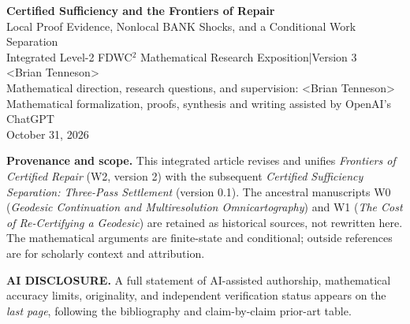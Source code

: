 \documentclass[11pt,letterpaper]{article}
\theoremstyle{definition}
\theoremstyle{remark}
\newcommand{\bn}{\textless{}Brian Tenneson\textgreater{}}
\begin{document}
\begin{center}
{\huge\bfseries\color{MidnightBlue} Certified Sufficiency and the Frontiers of Repair}\\[6pt]
{\large Local Proof Evidence, Nonlocal BANK Shocks, and a Conditional Work Separation}\\[8pt]
{\normalsize Integrated Level-2 FDWC$^2$ Mathematical Research Exposition\quad |\quad Version 3}\\[11pt]
{\large\bn}\\[3pt]
{\small Mathematical direction, research questions, and supervision: \bn}\\
{\small Mathematical formalization, proofs, synthesis and writing assisted by OpenAI's ChatGPT}\\[5pt]
{\small October 31, 2026}
\end{center}
\vspace{.35em}
\noindent\textbf{Provenance and scope.} This integrated article revises and unifies \emph{Frontiers of Certified Repair} (W2, version 2) with the subsequent \emph{Certified Sufficiency Separation: Three-Pass Settlement} (version 0.1). The ancestral manuscripts W0 (\emph{Geodesic Continuation and Multiresolution Omnicartography}) and W1 (\emph{The Cost of Re-Certifying a Geodesic}) are retained as historical sources, not rewritten here. The mathematical arguments are finite-state and conditional; outside references are for scholarly context and attribution.\par
\noindent\textbf{AI DISCLOSURE.} A full statement of AI-assisted authorship, mathematical accuracy limits, originality, and independent verification status appears on the \emph{last page}, following the bibliography and claim-by-claim prior-art table.
\end{document}

